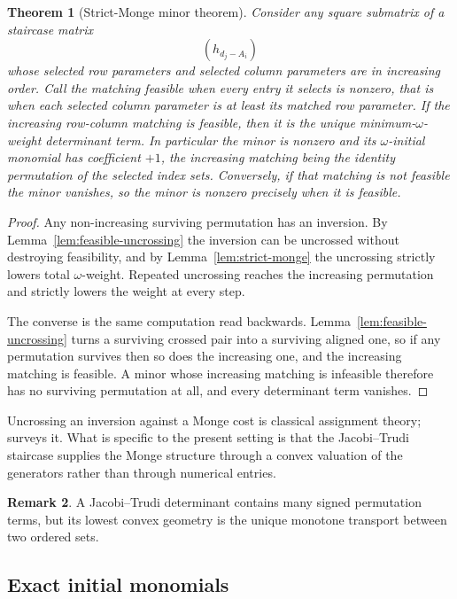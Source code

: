 \documentclass[11pt,a4paper]{amsart}
\numberwithin{equation}{section}
\theoremstyle{plain}
\newtheorem{theorem}{Theorem}[section]
\theoremstyle{definition}
\newtheorem{remark}[theorem]{Remark}
\begin{document}
\begin{theorem}[Strict-Monge minor theorem]\label{thm:monge-minor}
Consider any square submatrix of a staircase matrix
\[
(h_{d_j-A_i})
\]
whose selected row parameters and selected column parameters are in increasing order.  Call the matching \emph{feasible} when every entry it selects is nonzero, that is when each selected column parameter is at least its matched row parameter.  If the increasing row-column matching is feasible, then it is the unique minimum-\(\omega\)-weight determinant term.  In particular the minor is nonzero and its \(\omega\)-initial monomial has coefficient \(+1\), the increasing matching being the identity permutation of the selected index sets.  Conversely, if that matching is not feasible the minor vanishes, so the minor is nonzero precisely when it is feasible.
\end{theorem}

\begin{proof}
Any non-increasing surviving permutation has an inversion.  By Lemma~\ref{lem:feasible-uncrossing} the inversion can be uncrossed without destroying feasibility, and by Lemma~\ref{lem:strict-monge} the uncrossing strictly lowers total \(\omega\)-weight.  Repeated uncrossing reaches the increasing permutation and strictly lowers the weight at every step.

The converse is the same computation read backwards.  Lemma~\ref{lem:feasible-uncrossing} turns a surviving crossed pair into a surviving aligned one, so if any permutation survives then so does the increasing one, and the increasing matching is feasible.  A minor whose increasing matching is infeasible therefore has no surviving permutation at all, and every determinant term vanishes.
\end{proof}

Uncrossing an inversion against a Monge cost is classical assignment theory; \cite{Burkard1996MongeProperties} surveys it.  What is specific to the present setting is that the Jacobi--Trudi staircase supplies the Monge structure through a convex valuation of the generators rather than through numerical entries.

\begin{remark}
A Jacobi--Trudi determinant contains many signed permutation terms, but its lowest convex geometry is the unique monotone transport between two ordered sets.
\end{remark}

\subsection{Exact initial monomials}\label{subsec:action}
\end{document}
